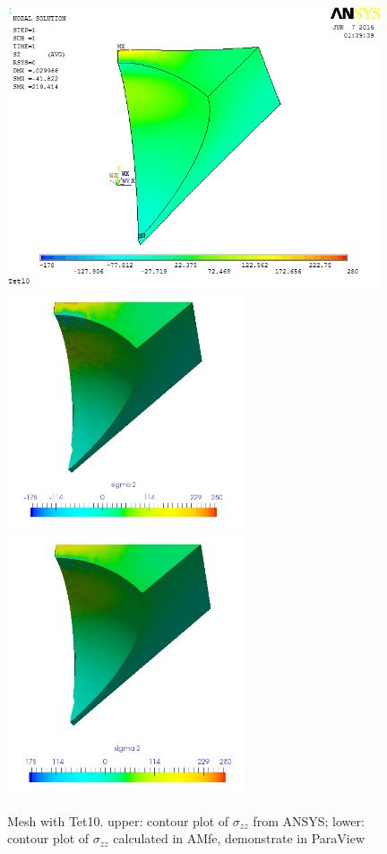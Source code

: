 \begin{figure}[htbp]
	\begin{center}
		\includegraphics[width=11cm,clip]{Tet10_Szz.png} 
		\includegraphics[width=7cm,clip]{Tet10_Szz_PD.png} 		
		\includegraphics[width=7cm,clip]{Tet10_Szz_P.png} 		
		\caption{Mesh with Tet10. upper: contour plot of $\sigma_{zz}$ from ANSYS; lower: contour plot of $\sigma_{zz}$ calculated in AMfe, demonstrate in ParaView} \label{fig: Tet10_Szz}
	\end{center}
\end{figure}
\clearpage 

